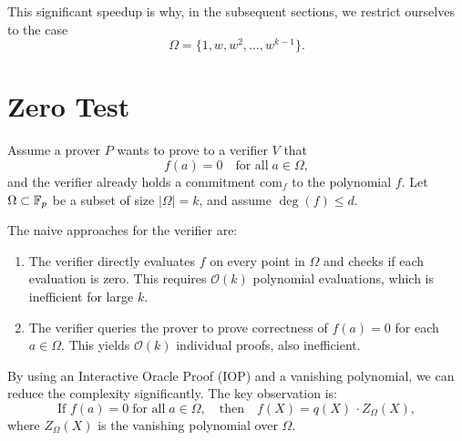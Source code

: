This significant speedup is why, in the subsequent sections, we restrict ourselves to the case
\[
    \Omega = \{1, w, w^2, \ldots, w^{k-1}\}.
\]


\section{Zero Test}
Assume a prover \(P\) wants to prove to a verifier \(V\) that 
\[
    f(a) = 0 \quad \text{for all} \; a \in \Omega,
\]
and the verifier already holds a commitment \(\text{com}_f\) to the polynomial \(f\).
Let \(\Omega \subset \mathbb{F}_p\) be a subset of size \(\lvert \Omega \rvert = k\), and assume \(\deg(f) \le d\).

The naive approaches for the verifier are:
\begin{enumerate}
    \item The verifier directly evaluates \(f\) on every point in \(\Omega\) and checks if each evaluation is zero. 
    This requires \(\mathcal{O}(k)\) polynomial evaluations, which is inefficient for large \(k\).
    \item The verifier queries the prover to prove correctness of \(f(a)=0\) for each \(a \in \Omega\). 
    This yields \(\mathcal{O}(k)\) individual proofs, also inefficient.
\end{enumerate}

By using an Interactive Oracle Proof (IOP) and a vanishing polynomial, we can reduce the complexity significantly. 
The key observation is:
\[
    \text{If } f(a) = 0 \; \text{for all} \; a \in \Omega, 
    \quad \text{then} \quad 
    f(X) = q(X)\,\cdot Z_{\Omega}(X),
\]
where \(Z_{\Omega}(X)\) is the vanishing polynomial over \(\Omega\). 


